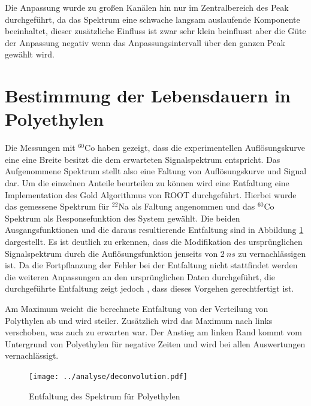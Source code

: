 \documentclass[a4paper,12pt]{article}
\begin{document}
Die Anpassung wurde zu großen Kanälen hin nur im Zentralbereich des Peak durchgeführt, da das Spektrum eine schwache langsam auslaufende Komponente beeinhaltet, 
dieser zusätzliche Einfluss ist zwar sehr klein beinflusst aber die Güte der Anpassung negativ wenn das Anpassungsintervall über den ganzen Peak gewählt wird.

\section{Bestimmung der Lebensdauern in Polyethylen}\label{cap:poly}
Die Messungen mit $^{60}$Co haben gezeigt, dass die experimentellen Auflösungskurve eine eine Breite besitzt die dem erwarteten Signalspektrum entspricht. Das Aufgenommene Spektrum
stellt also eine Faltung von Auflösungskurve und Signal dar. Um die einzelnen Anteile beurteilen zu
können wird eine Entfaltung eine Implementation des Gold Algorithmus\cite{gold_algo} von ROOT\cite{root} durchgeführt.
Hierbei wurde das gemessene Spektrum für $^{22}$Na als Faltung angenommen und das $^{60}$Co Spektrum als Responsefunktion des System
gewählt. Die beiden Ausgangsfunktionen und die daraus resultierende Entfaltung sind in Abbildung \ref{fig:deconvolution} dargestellt. Es ist deutlich zu erkennen, dass die
Modifikation des ursprünglichen Signalspektrum durch die Auflösungsfunktion jenseits von $\SI{2}{ns}$ zu vernachlässigen ist. Da die Fortpflanzung der Fehler bei
der Entfaltung nicht stattfindet werden die weiteren Anpassungen an den ursprünglichen Daten durchgeführt, die durchgeführte Entfaltung zeigt jedoch
, dass dieses Vorgehen gerechtfertigt ist.

Am Maximum weicht die berechnete Entfaltung von der Verteilung von Polythylen ab und wird steiler.
Zusätzlich wird das Maximum nach links verschoben, was auch zu erwarten war.
Der Anstieg am linken Rand kommt vom Untergrund von Polyethylen für negative Zeiten und wird bei allen Auswertungen vernachlässigt.


\begin{figure}
	\texttt{[image: ../analyse/deconvolution.pdf]}
	\caption{Entfaltung des Spektrum für Polyethylen}
	\label{fig:deconvolution}
\end{figure}
\end{document}
